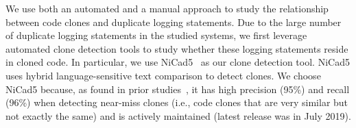 



We use both an automated and a manual approach to study the relationship between code clones and duplicate logging statements. Due to the large number of duplicate logging statements in the studied systems, we first leverage automated clone detection tools to study whether these logging statements reside in cloned code. In particular, we use NiCad5~\cite{nicad} as our clone detection tool. NiCad5 uses hybrid language-sensitive text comparison to detect clones. We choose NiCad5 because, as found in prior studies~\cite{nicad,NicadEvaluation}, it has high precision (95\%) and recall (96\%) when detecting near-miss clones (i.e., code clones that are very similar but not exactly the same) and is actively maintained (latest release was in July 2019). %

